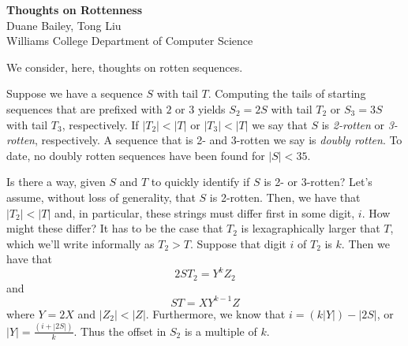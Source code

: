 \documentclass[11pt]{article}
\def\emph#1{{\em #1\/}}
\def\term#1{\emph{#1}}
\def\ni{\noindent}
\begin{document}
\begin{center}
{\bf Thoughts on Rottenness}\\
Duane Bailey, Tong Liu\\
Williams College Department of Computer Science\\
\end{center}

We consider, here, thoughts on rotten sequences.

Suppose we have a sequence $S$ with tail $T$.  Computing the tails of starting
sequences that are prefixed with $2$ or $3$ yields $S_2=2S$ with tail $T_2$
or $S_3=3S$ with tail $T_3$, respectively.  If $|T_2| < |T|$ or $|T_3|<|T|$
we say that $S$ is \term{2-rotten} or \term{3-rotten}, respectively.  A sequence
that is 2- and 3-rotten we say is \term{doubly rotten}.  To date, no doubly
rotten sequences have been found for $|S|<35$.

Is there a way, given $S$ and $T$ to quickly identify if $S$ is 2- or 3-rotten?
Let's assume, without loss of generality, that $S$ is 2-rotten.  Then, we have
that $|T_2|<|T|$ and, in particular, these strings must differ first in some
digit, $i$.  How might these differ?  It has to be the case that $T_2$ is
lexagraphically larger that $T$, which we'll write informally as $T_2>T$.
Suppose that digit $i$ of $T_2$ is $k$.  Then we have that
$$2ST_2=Y^kZ_2$$
\ni and
$$ST=XY^{k-1}Z$$
\ni where $Y=2X$ and $|Z_2|<|Z|$.  Furthermore, we know that $i=(k|Y|)-|2S|$,
or $|Y|=\frac{(i+|2S|)}k$.  Thus the offset in $S_2$ is a multiple of $k$.
\end{document}
